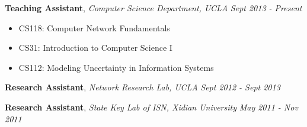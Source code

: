 \documentclass[9pt]{article}
\newenvironment{changemargin}[2]{%
  \begin{list}{}{%
    \setlength{\topsep}{0pt}%
    \setlength{\leftmargin}{#1}%
    \setlength{\rightmargin}{#2}%
    \setlength{\listparindent}{\parindent}%
    \setlength{\itemindent}{\parindent}%
    \setlength{\parsep}{\parskip}%
  }%
  \item[]}{\end{list}
}
\newcommand{\lineover}{
	\begin{changemargin}{-0.05in}{-0.05in}
		\vspace*{-8pt}
		\hrulefill \\
		\vspace*{-2pt}
	\end{changemargin}
}
\newcommand{\header}[1]{
	\begin{changemargin}{-0.5in}{-0.5in}
		\scshape{#1}\\
  	\lineover
	\end{changemargin}
}
\newenvironment{body} {
	\vspace*{-16pt}
	\begin{changemargin}{-0.25in}{-0.5in}
  }	
	{\end{changemargin}
}
\begin{document}
\begin{body}
	\vspace{14pt}
	\textbf{Teaching Assistant}, \emph{Computer Science Department, UCLA} 
	\hfill {} \emph{Sept 2013 - Present}\\
	\vspace*{-4pt}
	\begin{itemize} \itemsep -0pt
		\item CS118: Computer Network Fundamentals
		\item CS31: Introduction to Computer Science I
		\item CS112: Modeling Uncertainty in Information Systems
	\end{itemize}

	\textbf{Research Assistant}, \emph{Network Research Lab, UCLA}
	\hfill {} \emph{Sept 2012 - Sept 2013}\\

	\smallskip
	
	\textbf{Research Assistant}, \emph{State Key Lab of ISN, Xidian University}
	\hfill {} \emph{May 2011 - Nov 2011}\\

\end{body}



%
\end{document}
